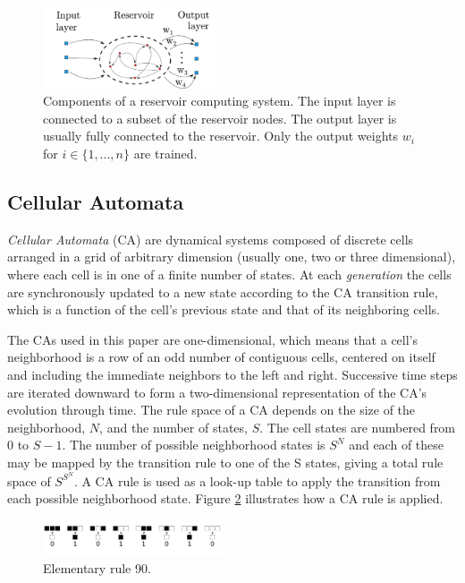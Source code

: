 \documentclass{elsarticle}
\begin{document}
\begin{multicols}{2}
	\begin{figure}[H]
		\centering
		\includegraphics[width=0.475\textwidth]{Reservoir2.pdf}
		\caption{Components of a reservoir computing system. The input layer is connected to 
			a subset of the reservoir nodes. The output layer is usually fully connected to the 
			reservoir. Only the output weights $w_{i}$ for $i \in \{1, ..., 
			n\}$ are trained.} 
		
		\label{reservoir_layout}
	\end{figure}
	
	\subsection{Cellular Automata}
	\textit{Cellular Automata} (CA) are dynamical systems composed of discrete cells 
	arranged in a grid of arbitrary dimension (usually one, two or three 
	dimensional), where each cell is in one of a finite number of states.  
	At each \textit{generation} the cells are synchronously updated to a new state 
	according to the CA transition rule, which is a function of the cell's previous 
	state and that of its neighboring cells. \par
	The CAs used in this paper are one-dimensional, which means that a cell's 
	neighborhood is a row of an odd number of contiguous cells, centered on itself 
	and including the immediate neighbors to the left and right.  Successive 
	time steps are iterated downward to form a two-dimensional representation of the 
	CA's evolution through time. The rule space of a CA depends on the size of the 
	neighborhood, $N$, and the number of states, $S$. The cell states are numbered from 
	0 to $S - 1$. The number of possible neighborhood states is $ S^N $ and each of 
	these may be mapped by the transition rule to one of the S states, giving a 
	total rule space of $ S^{S^N} $. A CA rule is used as a look-up table to apply 
	the transition from each possible neighborhood state. Figure \ref{ca_rule} 
	illustrates how a CA rule is applied.
	\begin{figure}[H]
		\centering
		\includegraphics[width=0.475\textwidth]{Rule90.pdf}
		\caption{Elementary rule 90.}
		\label{ca_rule}
	\end{figure}
	

\end{multicols}
\end{document}

